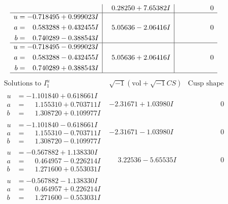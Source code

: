 \documentclass[1p]{elsarticle_modified}
\theoremstyle{definition}
\newcommand{\I}{\sqrt{-1}}
\begin{document}
$$\begin{array}{c|c|c}
 & \phantom{-}0.28250 + 7.65382 I & \phantom{-0.000000 } 0 \\ \hline\begin{aligned}
u &= -0.718495 + 0.999023 I \\
a &= \phantom{-}0.583288 + 0.432455 I \\
b &= \phantom{-}0.740289 - 0.388543 I\end{aligned}
 & \phantom{-}5.05636 - 2.06416 I & \phantom{-0.000000 } 0 \\ \hline\begin{aligned}
u &= -0.718495 - 0.999023 I \\
a &= \phantom{-}0.583288 - 0.432455 I \\
b &= \phantom{-}0.740289 + 0.388543 I\end{aligned}
 & \phantom{-}5.05636 + 2.06416 I & \phantom{-0.000000 } 0\\
 \hline 
 \end{array}$$\newpage$$\begin{array}{c|c|c}  
\text{Solutions to }I^u_{1}& \I (\text{vol} + \sqrt{-1}CS) & \text{Cusp shape}\\
 \hline 
\begin{aligned}
u &= -1.101840 + 0.618661 I \\
a &= \phantom{-}1.155310 + 0.703711 I \\
b &= \phantom{-}1.308720 + 0.109977 I\end{aligned}
 & -2.31671 + 1.03980 I & \phantom{-0.000000 } 0 \\ \hline\begin{aligned}
u &= -1.101840 - 0.618661 I \\
a &= \phantom{-}1.155310 - 0.703711 I \\
b &= \phantom{-}1.308720 - 0.109977 I\end{aligned}
 & -2.31671 - 1.03980 I & \phantom{-0.000000 } 0 \\ \hline\begin{aligned}
u &= -0.567882 + 1.138330 I \\
a &= \phantom{-}0.464957 - 0.226214 I \\
b &= \phantom{-}1.271600 + 0.553031 I\end{aligned}
 & \phantom{-}3.22536 - 5.65535 I & \phantom{-0.000000 } 0 \\ \hline\begin{aligned}
u &= -0.567882 - 1.138330 I \\
a &= \phantom{-}0.464957 + 0.226214 I \\
b &= \phantom{-}1.271600 - 0.553031 I\end{aligned}

\end{array}$$
\end{document}

